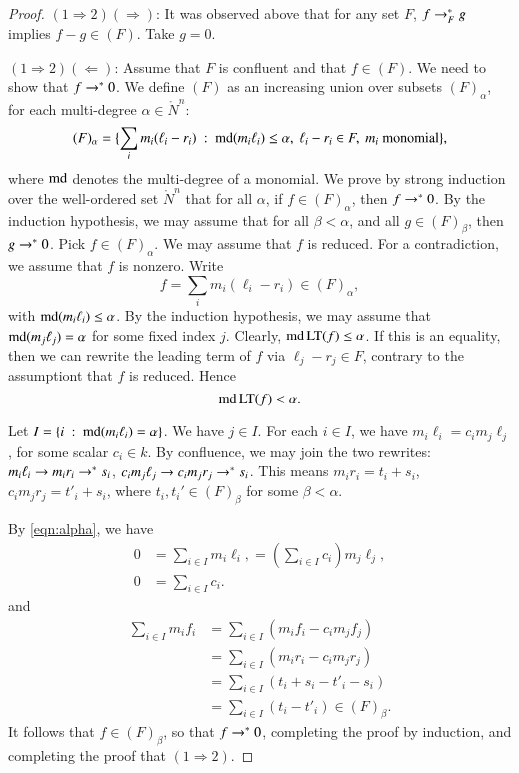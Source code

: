 \documentclass{llncs}
\def\op#1{{\hbox{#1}}}
\begin{document}
\begin{proof}
$(1\Rightarrow 2)(\Rightarrow)$:  It was observed above that for any set $F$,
$f\rightarrow^*_F g$ implies $f - g\in (F)$.  Take $g=0$.

$(1\Rightarrow 2)(\Leftarrow)$:  Assume that $F$ is confluent and that $f\in (F)$.
We need to show that $f\rightarrow^*0$.    We define $(F)$ as an increasing union over subsets $(F)_\alpha$, for each multi-degree $\alpha\in\ring{N}^n$:
\[
(F)_\alpha = \{\sum_i m_i (\ell_i-r_i) \mid \op{md} (m_i \ell_i) \le \alpha,\ \ell_i-r_i\in F,\ m_i~ \text{monomial} \},
\]
where $\op{md}$ denotes the multi-degree of a monomial.
We prove by strong induction over the well-ordered set $\ring{N}^n$ that
for all $\alpha$,  if $f\in (F)_\alpha$, then $f\rightarrow^* 0$.  By the induction hypothesis,
we may assume that for all $\beta < \alpha$, and all  $g\in (F)_\beta$, then $g\rightarrow^* 0$.
Pick $f\in (F)_\alpha$.  We may assume that $f$ is reduced.  For a contradiction,
we assume that $f$ is nonzero.   Write
\[
f = \sum_i m_i (\ell_i-r_i) \in (F)_\alpha,
\]
with $\op{md} (m_i \ell_i) \le \alpha$.  By the induction hypothesis, we may assume
that $\op{md}(m_j \ell_j) = \alpha$ for some fixed index $j$.  Clearly, $\op{md}\,\op{LT}(f)\le\alpha$.
If this is an equality, then we can rewrite the leading term of $f$ via $\ell_j - r_j\in F$,
contrary to the assumptiont that $f$ is reduced.  Hence 
\begin{equation}\label{eqn:alpha}
\op{md}\,\op{LT}(f) < \alpha.
\end{equation}

Let $I = \{i \mid \op{md}(m_i\ell_i) = \alpha\}$.  We have $j\in I$.
For each $i\in I$, we have $m_i \ell_i = c_i m_j \ell_j$, for some scalar $c_i\in k$.
By confluence, we may join the two rewrites: $m_i\ell_i\rightarrow m_i r_i\rightarrow^* s_i$, $c_i m_j \ell_j\rightarrow c_i m_j r_j\rightarrow^* s_i$.  This means $m_i r_i = t_i + s_i$, $c_i m_j r_j = t'_i +s_i$, where $t_i,t_i'\in (F)_\beta$ for some $\beta<\alpha$.

By \eqref{eqn:alpha}, we have
\begin{align*}
0 &= \sum_{i\in I} m_i \ell_i, = (\sum_{i\in I} c_i) m_j \ell_j,\\
0 &= \sum_{i\in I} c_i.
\end{align*}
and
\begin{align*}
\sum_{i\in I} m_i f_i 
  &= \sum_{i\in I} (m_i f_i - c_i m_j f_j)\\
  &= \sum_{i\in I} (m_i r_i - c_i m_j r_j)\\
  &= \sum_{i\in I} (t_i + s_i - t'_i - s_i)\\
  &=\sum_{i\in I} (t_i - t'_i) \in (F)_\beta.
\end{align*}
It follows that $f\in (F)_\beta$, so that $f\rightarrow^* 0$, completing the proof by induction,
and completing the proof that $(1\Rightarrow 2)$.


\end{proof}
\end{document}
